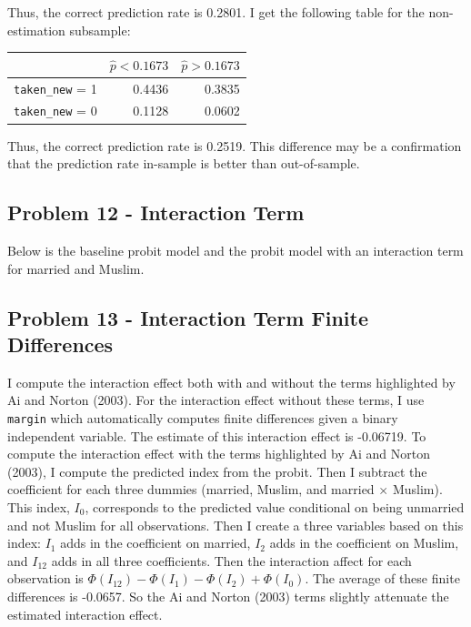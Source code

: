 \documentclass{article}
\begin{document}
Thus, the correct prediction rate is 0.2801. I get the following table for the non-estimation subsample:

\begin{center}
\begin{tabular}{ l | r r }
 & $\hat{p} < 0.1673$ & $\hat{p} > 0.1673$\\ 
\hline
\texttt{taken\_new} = 1 & 0.4436 & 0.3835 \\  
\texttt{taken\_new} = 0 & 0.1128 & 0.0602
\end{tabular}
\end{center}

Thus, the correct prediction rate is 0.2519.  This difference may be a confirmation that the prediction rate in-sample is better than out-of-sample. 

\pagebreak

\subsection*{Problem 12 - Interaction Term}

Below is the baseline probit model and the probit model with an interaction term for married and Muslim.

\bigskip

\begin{center}

\end{center}

\bigskip

\subsection*{Problem 13 - Interaction Term Finite Differences}

I compute the interaction effect both with and without the terms highlighted by Ai and Norton (2003).  For the interaction effect without these terms, I use \texttt{margin} which automatically computes finite differences given a binary independent variable. The estimate of this interaction effect is -0.06719.  To compute the interaction effect with the terms highlighted by Ai and Norton (2003), I compute the predicted index from the probit.  Then I subtract the coefficient for each three dummies (married, Muslim, and married $\times$ Muslim).  This index, $I_0$, corresponds to the predicted value conditional on being unmarried and not Muslim for all observations.  Then I create a three variables based on this index: $I_1$ adds in the coefficient on married, $I_2$ adds in the coefficient on Muslim, and $I_{12}$ adds in all three coefficients.  Then the interaction affect for each observation is $\Phi(I_{12}) - \Phi(I_1) - \Phi(I_2) + \Phi(I_0)$.  The average of these finite differences is -0.0657. So the Ai and Norton (2003) terms slightly attenuate the estimated interaction effect.
\end{document}
